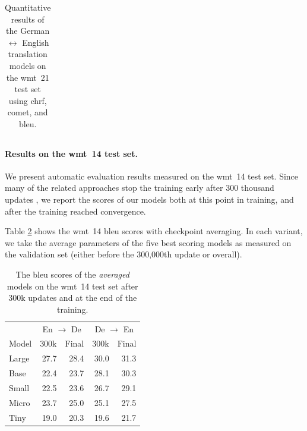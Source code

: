 \begin{table}
\begin{tabular}{lrrr@{}>{\small \enspace \textpm}lrrr@{}>{\small \enspace
        \textpm}l}
    \bottomrule
  \end{tabular}

  \caption{Quantitative results of the German $\leftrightarrow$ English
    translation models on the \acs{wmt}~21 test set using \acs{chrf},
    \acs{comet}, and \acs{bleu}.}%
  \label{tab:wmt21-scores}
\end{table}


\paragraph{Results on the \acs{wmt}~14 test set.}
We present automatic evaluation results measured on the \acs{wmt}~14 test set.
Since many of the related approaches stop the training early after 300 thousand
updates \citep{gu2017nonautoregressive, gu-kong-2021-fully}, we report the
scores of our models both at this point in training, and after the training
reached convergence.

Table \ref{tab:wmt14-weight-avg} shows the \acs{wmt}~14 \acs{bleu} scores with
checkpoint averaging. In each variant, we take the average parameters of the
five best scoring models as measured on the validation set (either before the
300,000th update or overall).

\begin{table}
  \centering

  \begin{tabular}{lrrrr}
    \toprule
    & \multicolumn{2}{c}{En $\rightarrow$ De}
    & \multicolumn{2}{c}{De $\rightarrow$ En} \\
    Model
    & 300k & Final & 300k &  Final \\
    \midrule

    Large & 27.7 & 28.4 & 30.0 & 31.3 \\
    Base  & 22.4 & 23.7 & 28.1 & 30.3 \\
    Small & 22.5 & 23.6 & 26.7 & 29.1 \\
    Micro & 23.7 & 25.0 & 25.1 & 27.5 \\
    Tiny  & 19.0 & 20.3 & 19.6 & 21.7 \\

    \bottomrule
  \end{tabular}

  \caption{The \acs{bleu} scores of the \emph{averaged} models on the
    \acs{wmt}~14 test set after 300k updates and at the end of the training.}%
  \label{tab:wmt14-weight-avg}

\end{table}



